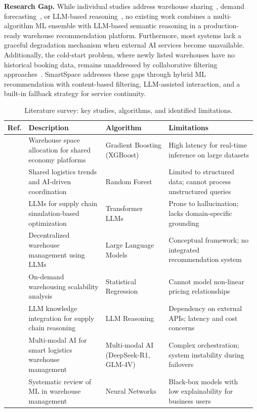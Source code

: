 \documentclass[pdflatex,sn-mathphys-num]{sn-jnl}
\theoremstyle{thmstyleone}
\theoremstyle{thmstyletwo}
\theoremstyle{thmstylethree}
\begin{document}
\textbf{Research Gap.} While individual studies address warehouse sharing~\cite{b1}, demand forecasting~\cite{b10}, or LLM-based reasoning~\cite{b3, b7}, no existing work combines a multi-algorithm ML ensemble with LLM-based semantic reasoning in a production-ready warehouse recommendation platform. Furthermore, most systems lack a graceful degradation mechanism when external AI services become unavailable. Additionally, the cold-start problem, where newly listed warehouses have no historical booking data, remains unaddressed by collaborative filtering approaches~\cite{b10}. SmartSpace addresses these gaps through hybrid ML recommendation with content-based filtering, LLM-assisted interaction, and a built-in fallback strategy for service continuity.

\begin{table}[ht]
\caption{Literature survey: key studies, algorithms, and identified limitations.}\label{tab:literature}
\centering
\small
\begin{tabular}{|c|p{3.5cm}|p{2.8cm}|p{3.8cm}|}
\hline
\textbf{Ref.} & \textbf{Description} & \textbf{Algorithm} & \textbf{Limitations} \\
\hline
\cite{b1} & Warehouse space allocation for shared economy platforms & Gradient Boosting (XGBoost) & High latency for real-time inference on large datasets \\
\hline
\cite{b2} & Shared logistics trends and AI-driven coordination & Random Forest & Limited to structured data; cannot process unstructured queries \\
\hline
\cite{b3} & LLMs for supply chain simulation-based optimization & Transformer LLMs & Prone to hallucination; lacks domain-specific grounding \\
\hline
\cite{b4} & Decentralized warehouse management using LLMs & Large Language Models & Conceptual framework; no integrated recommendation system \\
\hline
\cite{b5} & On-demand warehousing scalability analysis & Statistical Regression & Cannot model non-linear pricing relationships \\
\hline
\cite{b7} & LLM knowledge integration for supply chain reasoning & LLM Reasoning & Dependency on external APIs; latency and cost concerns \\
\hline
\cite{b9} & Multi-modal AI for smart logistics warehouse management & Multi-modal AI (DeepSeek-R1, GLM-4V) & Complex orchestration; system instability during failovers \\
\hline
\cite{b10} & Systematic review of ML in warehouse management & Neural Networks & Black-box models with low explainability for business users \\
\hline
\end{tabular}
\end{table}
\end{document}
